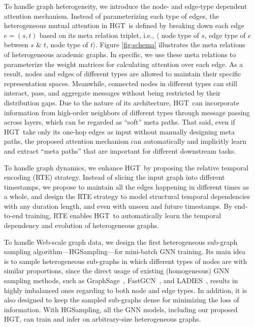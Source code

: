 \documentclass[sigconf]{acmart}
\theoremstyle{definition}
\newcommand{\short}{HGT}
\newcommand{\sampling}{HGSampling}
\begin{document}
To handle graph heterogeneity, we introduce the node- and edge-type dependent attention mechanism.
Instead of parameterizing each type of edges, the heterogeneous mutual attention in \short\ is defined by breaking down each edge $e=(s,t)$ based on its meta relation triplet, i.e., $\langle$ node type of $s$, edge type of $e$ between $s$ \& $t$, node type of $t \rangle$. Figure \ref{fig:schema} illustrates the meta relations of heterogeneous academic graphs. 
In specific, we use these meta relations to parameterize the weight matrices for calculating attention over each edge.
As a result, nodes and edges of different types are allowed to maintain their specific representation spaces.
Meanwhile, connected nodes in different types can still interact, pass, and aggregate messages without being restricted by their distribution gaps.
Due to the nature of its architecture, \short\ can incorporate information from high-order neighbors of different types through message passing across layers, which can be regarded as ``soft'' meta paths. 
That said, even if \short\ take only its one-hop edges as input without manually designing meta paths, the proposed attention mechanism can automatically and implicitly learn and extract ``meta paths'' that are important for different downstream tasks. 


To handle graph dynamics, we enhance \short\ by proposing the relative temporal encoding (RTE) strategy. 
Instead of slicing the input graph into different timestamps, we propose to maintain all the edges happening in different times as a whole, and design the RTE strategy to model structural temporal dependencies with any duration length, and even with unseen and future timestamps. 
By end-to-end training, RTE enables \short\ to automatically learn the temporal dependency and evolution of heterogeneous graphs. 


To handle Web-scale graph data, we design the first heterogeneous sub-graph sampling algorithm---\sampling---for mini-batch GNN training. 
Its main idea is to sample heterogeneous sub-graphs in which different types of nodes are with similar proportions, since the direct usage of existing (homogeneous) GNN sampling methods, such as GraphSage~\cite{graphsage}, FastGCN~\cite{fastgcn}, and LADIES~\cite{ladies}, results in highly imbalanced ones regarding to both node and edge types. 
In addition, it is also designed to keep the sampled sub-graphs dense for minimizing the loss of information. 
With \sampling, all the GNN models, including our proposed \short, can train and infer on arbitrary-size heterogeneous graphs. 
\end{document}
